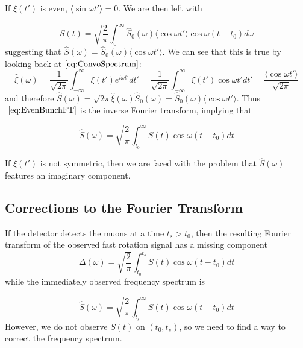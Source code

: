 If $\xi(t')$ is even, $\langle\sin\omega t'\rangle=0$. We are then left with 

\begin{equation}
S(t)=\sqrt{\frac{2}{\pi}}\int^{\infty}_0\hat{S}_0(\omega)\langle\cos\omega t'\rangle\cos\omega(t-t_0)d\omega
\label{eq:EvenBunchFT}
\end{equation} suggesting that $\hat{S}(\omega)=\hat{S}_0(\omega)\langle\cos\omega t'\rangle$. We can see that this is true by looking back at$~\eqref{eq:ConvoSpectrum}$: \[\hat{\xi}(\omega)=\frac{1}{\sqrt{2\pi}}\int^{\infty}_{-\infty}\xi(t')e^{i\omega t'}dt'=\frac{1}{\sqrt{2\pi}}\int^{\infty}_{-\infty}\xi(t')\cos\omega t'dt'=\frac{\langle\cos\omega t'\rangle}{\sqrt{2\pi}}\] and therefore $\hat{S}(\omega)=\sqrt{2\pi}\hat{\xi}(\omega)\hat{S}_0(\omega)=\hat{S}_0(\omega)\langle\cos\omega t'\rangle$. Thus$~\eqref{eq:EvenBunchFT}$ is the inverse Fourier transform, implying that 

\begin{equation}
\hat{S}(\omega)=\sqrt{\frac{2}{\pi}}\int^{\infty}_{t_0}S(t)\cos\omega(t-t_0)dt
\label{eq:integEvenBunchFT}
\end{equation}

If $\xi(t')$ is not symmetric, then we are faced with the problem that $\hat{S}(\omega)$ features an imaginary component.

\subsection{Corrections to the Fourier Transform}

If the detector detects the muons at a time $t_s>t_0$, then the resulting Fourier transform of the observed fast rotation signal has a missing component 
\begin{equation}
\Delta(\omega)=\sqrt{\frac{2}{\pi}}\int^{t_s}_{t_0}S(t)\cos\omega(t-t_0)dt
\label{eq:Delta}
\end{equation} while the immediately observed frequency spectrum is 

\begin{equation}
\hat{S}(\omega)=\sqrt{\frac{2}{\pi}}\int^{\infty}_{t_s}S(t)\cos\omega(t-t_0)dt
\label{eq:firstapprox}
\end{equation}
However, we do not observe $S(t)$ on $(t_0,t_s)$, so we need to find a way to correct the frequency spectrum. 

